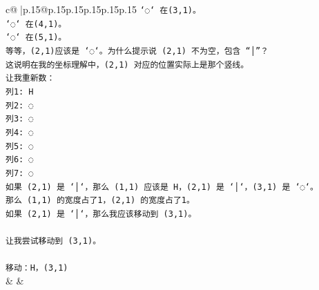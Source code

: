 \documentclass{article}
\begin{document}
{\begin{supertabular}{c@{$\;$}|p{.15\linewidth}@{}p{.15\linewidth}p{.15\linewidth}p{.15\linewidth}p{.15\linewidth}p{.15\linewidth}}
{{{\texttt{`◌` 在(3,1)。} \\
\texttt{`◌` 在(4,1)。} \\
\texttt{`◌` 在(5,1)。} \\
\texttt{等等，(2,1)应该是 `◌`。为什么提示说 (2,1) 不为空，包含 “│”？} \\
\texttt{这说明在我的坐标理解中，(2,1) 对应的位置实际上是那个竖线。} \\
\texttt{让我重新数：} \\
\texttt{列1: H} \\
\texttt{列2: ◌} \\
\texttt{列3: ◌} \\
\texttt{列4: ◌} \\
\texttt{列5: ◌} \\
\texttt{列6: ◌} \\
\texttt{列7: ◌} \\
\texttt{如果 (2,1) 是 `│`，那么 (1,1) 应该是 H，(2,1) 是 `│`，(3,1) 是 `◌`。} \\
\texttt{那么 (1,1) 的宽度占了1，(2,1) 的宽度占了1。} \\
\texttt{如果 (2,1) 是 `│`，那么我应该移动到 (3,1)。} \\
\\ 
\texttt{让我尝试移动到 (3,1)。} \\
\\ 
\texttt{移动：H，(3,1)} \\
            }
        }
    }
    & & \\ \\


\end{supertabular}}
\end{document}
